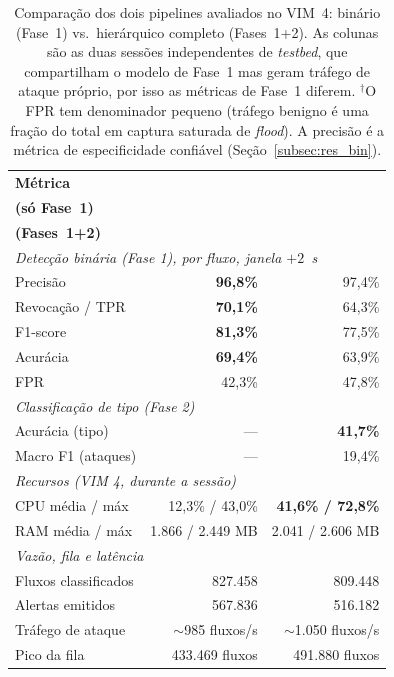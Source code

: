 \documentclass[12pt]{article}
\begin{document}
\begin{table}[ht]
\centering
\caption{Comparação dos dois pipelines avaliados no VIM~4: binário (Fase~1) vs.\
hierárquico completo (Fases~1+2). As colunas são as duas sessões independentes de
\textit{testbed}, que compartilham o modelo de Fase~1 mas geram tráfego de ataque
próprio, por isso as métricas de Fase~1 diferem. $^\dagger$O FPR tem denominador
pequeno (tráfego benigno é uma fração do total em captura saturada de \textit{flood}).
A precisão é a métrica de especificidade confiável (Seção~\ref{subsec:res_bin}).}
\label{tab:comparison}
\begin{tabular}{@{}lrr@{}}
\toprule
\textbf{Métrica} & \shortstack[r]{\textbf{IDS Binário}\\ \textbf{(só Fase~1)}}
                 & \shortstack[r]{\textbf{IDS Multiclasse}\\ \textbf{(Fases~1+2)}} \\ \midrule
\multicolumn{3}{l}{\textit{Detecção binária (Fase 1), por fluxo, janela $+2$~s}} \\
\quad Precisão            & \textbf{96,8\%} & 97,4\% \\
\quad Revocação / TPR     & \textbf{70,1\%} & 64,3\% \\
\quad F1-score            & \textbf{81,3\%} & 77,5\% \\
\quad Acurácia            & \textbf{69,4\%} & 63,9\% \\
\quad FPR\rlap{$^\dagger$} & 42,3\%          & 47,8\% \\ \midrule
\multicolumn{3}{l}{\textit{Classificação de tipo (Fase 2)}} \\
\quad Acurácia (tipo)   & —               & \textbf{41,7\%} \\
\quad Macro F1 (ataques) & —              & 19,4\% \\
\midrule
\multicolumn{3}{l}{\textit{Recursos (VIM 4, durante a sessão)}} \\
\quad CPU média / máx   & 12,3\% / 43,0\% & \textbf{41,6\% / 72,8\%} \\
\quad RAM média / máx   & 1.866 / 2.449 MB & 2.041 / 2.606 MB \\ \midrule
\multicolumn{3}{l}{\textit{Vazão, fila e latência}} \\
\quad Fluxos classificados & 827.458 & 809.448 \\
\quad Alertas emitidos  & 567.836 & 516.182 \\
\quad Tráfego de ataque & $\sim$985 fluxos/s & $\sim$1.050 fluxos/s \\
\quad Pico da fila      & 433.469 fluxos & 491.880 fluxos \\

\end{tabular}
\end{table}
\end{document}
